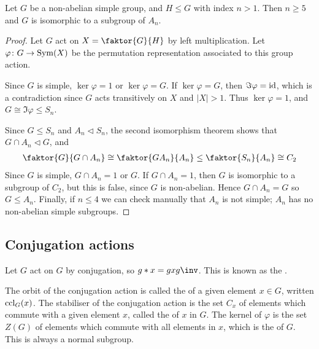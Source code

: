 \begin{theorem}
	Let $G$ be a non-abelian simple group, and $H \leq G$ with index $n > 1$.
	Then $n \geq 5$ and $G$ is isomorphic to a subgroup of $A_n$.
\end{theorem}

\begin{proof}
	Let $G$ act on $X = \faktor{G}{H}$ by left multiplication.
	Let $\varphi \colon G \to \operatorname{Sym}(X)$ be the permutation representation associated to this group action.

	Since $G$ is simple, $\ker \varphi = 1$ or $\ker \varphi = G$.
	If $\ker \varphi = G$, then $\Im\varphi = \operatorname{id}$, which is a contradiction since $G$ acts transitively on $X$ and $|X| > 1$.
	Thus $\ker \varphi = 1$, and $G \cong \Im\varphi \leq S_n$.

	Since $G \leq S_n$ and $A_n \triangleleft S_n$, the second isomorphism theorem shows that $G \cap A_n \triangleleft G$, and
	\begin{align*}
		\faktor{G}{G \cap A_n} \cong \faktor{GA_n}{A_n} \leq \faktor{S_n}{A_n} \cong C_2
	\end{align*}
	Since $G$ is simple, $G \cap A_n = 1$ or $G$.
	If $G \cap A_n = 1$, then $G$ is isomorphic to a subgroup of $C_2$, but this is false, since $G$ is non-abelian.
	Hence $G \cap A_n = G$ so $G \leq A_n$.
	Finally, if $n \leq 4$ we can check manually that $A_n$ is not simple; $A_n$ has no non-abelian simple subgroups.
\end{proof}

\subsection{Conjugation actions}
\begin{example}
	Let $G$ act on $G$ by conjugation, so $g \ast x = g x g\inv$.
	This is known as the .
\end{example}

\begin{definition}
	The orbit of the conjugation action is called the  of a given element $x \in G$, written $\operatorname{ccl}_G(x)$.
	The stabiliser of the conjugation action is the set $C_x$ of elements which commute with a given element $x$, called the  of $x$ in $G$.
	The kernel of $\varphi$ is the set $Z(G)$ of elements which commute with all elements in $x$, which is the  of $G$.
	This is always a normal subgroup.
\end{definition}

